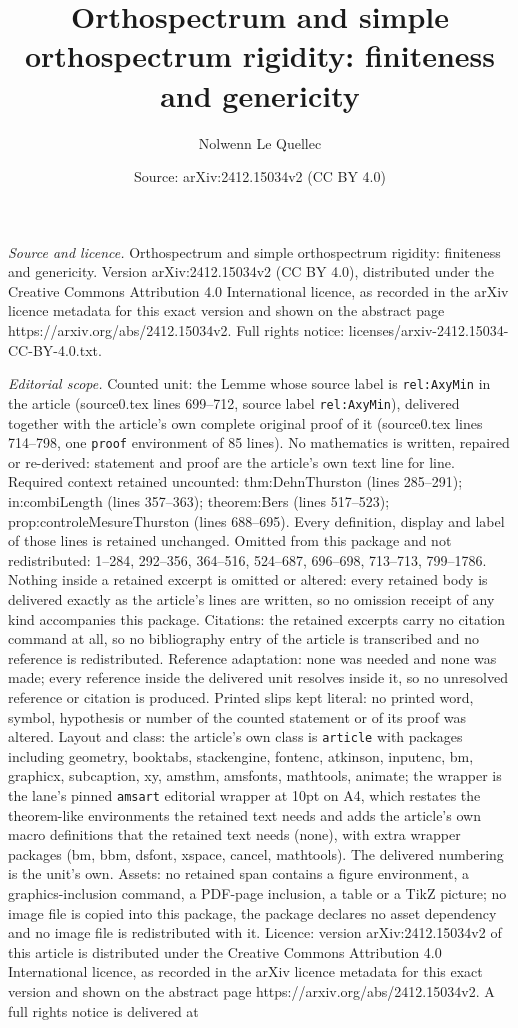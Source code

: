 \documentclass[10pt,a4paper]{amsart}
\title[Orthospectrum and simple orthospectrum rigidity: finiteness ]{Orthospectrum and simple orthospectrum rigidity: finiteness and genericity}
\author{Nolwenn Le Quellec}
\date{Source: arXiv:2412.15034v2 (CC BY 4.0)}
\begin{document}
\maketitle

\noindent\emph{Source and licence.} Orthospectrum and simple orthospectrum rigidity: finiteness and genericity. Version arXiv:2412.15034v2 (CC BY 4.0), distributed under the Creative Commons Attribution 4.0 International licence, as recorded in the arXiv licence metadata for this exact version and shown on the abstract page https://arxiv.org/abs/2412.15034v2. Full rights notice: licenses/arxiv-2412.15034-CC-BY-4.0.txt.\par\smallskip

\noindent\textit{Editorial scope.} Counted unit: the Lemme whose source label is \texttt{rel:AxyMin} in the article (source0.tex lines 699--712, source label \texttt{rel:AxyMin}), delivered together with the article's own complete original proof of it (source0.tex lines 714--798, one \texttt{proof} environment of 85 lines). No mathematics is written, repaired or re-derived: statement and proof are the article's own text line for line. Required context retained uncounted: thm:DehnThurston (lines 285--291); in:combiLength (lines 357--363); theorem:Bers (lines 517--523); prop:controleMesureThurston (lines 688--695). Every definition, display and label of those lines is retained unchanged. Omitted from this package and not redistributed: 1--284, 292--356, 364--516, 524--687, 696--698, 713--713, 799--1786. Nothing inside a retained excerpt is omitted or altered: every retained body is delivered exactly as the article's lines are written, so no omission receipt of any kind accompanies this package. Citations: the retained excerpts carry no citation command at all, so no bibliography entry of the article is transcribed and no reference is redistributed. Reference adaptation: none was needed and none was made; every reference inside the delivered unit resolves inside it, so no unresolved reference or citation is produced. Printed slips kept literal: no printed word, symbol, hypothesis or number of the counted statement or of its proof was altered. Layout and class: the article's own class is \texttt{article} with packages including geometry, booktabs, stackengine, fontenc, atkinson, inputenc, bm, graphicx, subcaption, xy, amsthm, amsfonts, mathtools, animate; the wrapper is the lane's pinned \texttt{amsart} editorial wrapper at 10pt on A4, which restates the theorem-like environments the retained text needs and adds the article's own macro definitions that the retained text needs (none), with extra wrapper packages (bm, bbm, dsfont, xspace, cancel, mathtools). The delivered numbering is the unit's own. Assets: no retained span contains a figure environment, a graphics-inclusion command, a PDF-page inclusion, a table or a TikZ picture; no image file is copied into this package, the package declares no asset dependency and no image file is redistributed with it. Licence: version arXiv:2412.15034v2 of this article is distributed under the Creative Commons Attribution 4.0 International licence, as recorded in the arXiv licence metadata for this exact version and shown on the abstract page https://arxiv.org/abs/2412.15034v2. A full rights notice is delivered at 
\end{document}

